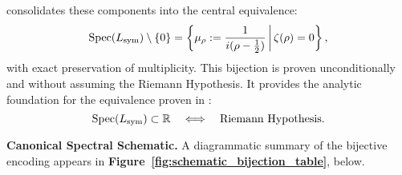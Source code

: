 \medskip
\noindent
{} consolidates these components into the central equivalence:
\[
\operatorname{Spec}(L_{\mathrm{sym}}) \setminus \{0\} = \left\{ \mu_\rho := \frac{1}{i(\rho - \tfrac{1}{2})} \,\middle|\, \zeta(\rho) = 0 \right\},
\]
with exact preservation of multiplicity. This bijection is proven unconditionally and without assuming the Riemann Hypothesis. It provides the analytic foundation for the equivalence proven in :
\[
\operatorname{Spec}(L_{\mathrm{sym}}) \subset \mathbb{R} \quad \Longleftrightarrow \quad \text{Riemann Hypothesis}.
\]

\medskip
\noindent
\textbf{Canonical Spectral Schematic.} A diagrammatic summary of the bijective encoding appears in \textbf{Figure~\ref{fig:schematic_bijection_table}}, below.


